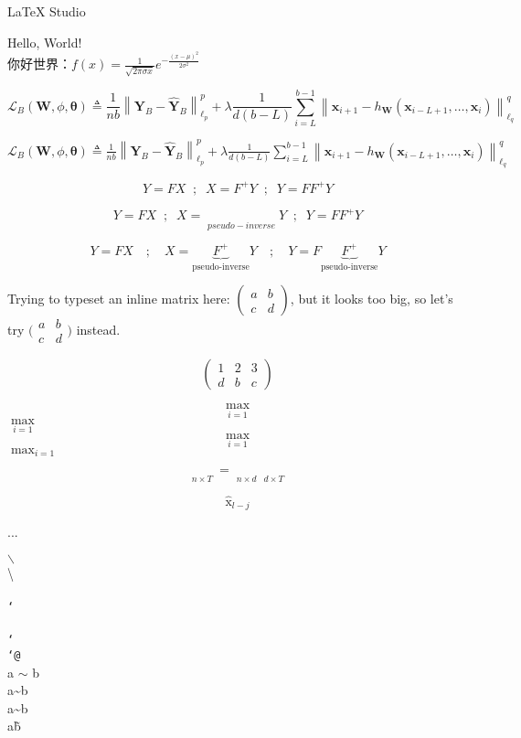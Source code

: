 \documentclass[UTF8, 10pt]{ctexart}
\begin{document}
	\LaTeX{} Studio
	
	Hello, World!\\
	你好世界：$f(x)=\frac{1}{\sqrt{2 \pi \sigma x}} e^{-\frac{(x-\mu)^{2}}{2 \sigma^{2}}}$
	
$$\mathcal{L}_{B}(\mathbf{W}, \phi, \boldsymbol{\theta}) \triangleq \frac{1}{n b}\left\|\mathbf{Y}_{B}-\hat{\mathbf{Y}}_{B}\right\|_{\ell_{p}}^{p}+\lambda \frac{1}{d(b-L)} \sum_{i=L}^{b-1}\left\|\mathbf{x}_{i+1}-h_{\mathbf{W}}\left(\mathbf{x}_{i-L+1}, \ldots, \mathbf{x}_{i}\right)\right\|_{\ell_{q}}^{q}$$

$\mathcal{L}_{B}(\mathbf{W}, \phi, \boldsymbol{\theta}) \triangleq \frac{1}{n b}\left\|\mathbf{Y}_{B}-\hat{\mathbf{Y}}_{B}\right\|_{\ell_{p}}^{p}+\lambda \frac{1}{d(b-L)} \sum_{i=L}^{b-1}\left\|\mathbf{x}_{i+1}-h_{\mathbf{W}}\left(\mathbf{x}_{i-L+1}, \ldots, \mathbf{x}_{i}\right)\right\|_{\ell_{q}}^{q}$

$$ Y=FX \;\; ; \;\; X=F^+Y \;\; ; \;\; Y=FF^+Y $$

$$ Y=FX \;\; ; \;\; 
X=\mathop{\underbrace{F^+}}\limits_{pseudo-inverse} Y \;\; ; \;\; 
Y=FF^+Y $$

$$Y=FX\quad;\quad
X=\underbrace{F^{+}}_{\text{pseudo-inverse}}Y\quad;\quad
Y=F \underbrace{F^{+}}_{\text{pseudo-inverse}} Y$$



Trying to typeset an inline matrix here:
$\begin{pmatrix}
	a & b\\ 
	c & d
\end{pmatrix}$, but it looks too big, so let's try 
$\big(\begin{smallmatrix}
	a & b\\
	c & d
\end{smallmatrix}\big)$ instead.

$$\begin{pmatrix}
	1 & 2 & 3\\
	d & b & c
\end{pmatrix}$$


$$ \max \limits_{i=1} $$
$ \max \limits_{i=1} $
$$ \max_{i=1} $$
$ \max_{i=1} $

$$
\mathop{\underbrace{Y}}
\limits_{n \times T}
= \mathop{\underbrace{F}}
\limits_{n \times d}
\mathop{\underbrace{X}}
\limits_{d \times T}
$$

$$\hat{\mathop{x}}_{l-j}$$

...

$\backslash$  \\
\textbackslash  \\
\texttt{}  \\
\texttt{\char`\\}  \\
\texttt{\char`~}  \\
\texttt{\char`@}  \\

a $\sim$ b  \\
a\textasciitilde b  \\
a\~{}b  \\
a\~b  \\
\end{document}
